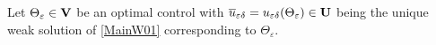 \documentclass[11pt,a4paper]{article}
\numberwithin{equation}{section}
\def\wo{\overline}
\def\O{\Omega}
\def\e{\varepsilon}
\def\ed{{\varepsilon\delta}}
\def\Gj{{\bf j}}
\def\Gm{{\bf m}}
\def\GJ{{\bf J}}
\def\GU{{\bf U}}
\def\GV{{\bf V}}
\begin{document}
%	
 Let $\Theta_\e\in \GV$ be an  optimal control with $\wo u_\ed=u_\ed(\Theta_\e)\in\GU$ being the unique weak solution of \eqref{MainW01} corresponding to $\Theta_\e$.
\end{document}
